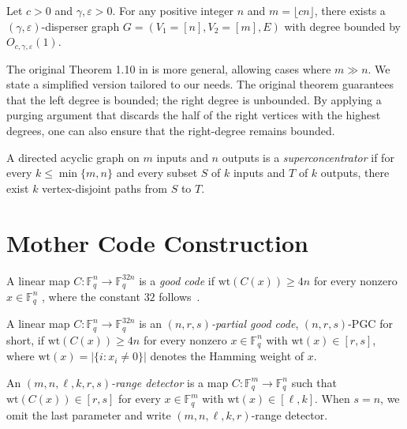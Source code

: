 \documentclass[11pt]{article}
\theoremstyle{named}
\begin{document}
\begin{theorem} \label{thm:prob_disperser} Let $c > 0$ and $\gamma, \varepsilon > 0$. For any positive integer $n$ and $m = \lfloor cn \rfloor$, there exists a $(\gamma, \varepsilon)$-disperser graph $G = (V_1 = [n], V_2 = [m], E)$ with degree bounded by $O_{c, \gamma, \varepsilon}(1)$.
\end{theorem}

The original Theorem 1.10 in \cite{RT00} is more general, allowing cases where $m \gg n$. We state a simplified version tailored to our needs. The original theorem guarantees that the left degree is bounded; the right degree is unbounded.
By applying a purging argument that discards the half of the right vertices with the highest degrees, one can also ensure that the right-degree remains bounded.

\begin{definition} \cite{Val75}
A directed acyclic graph on $m$ inputs and $n$ outputs is a \emph{superconcentrator} if for every $k \le \min\{m, n\}$ and every subset $S$ of $k$ inputs and $T$ of $k$ outputs, there exist $k$ vertex-disjoint paths from $S$ to $T$.
\end{definition}



\section{Mother Code Construction}

A linear map $C: \mathbb{F}_q^n \to \mathbb{F}_q^{32n}$ is a \emph{good code} if $\mathrm{wt}(C(x)) \ge 4n$ for every nonzero $x \in \mathbb{F}_q^n$ \cite{drucker2023minimum}, where the constant $32$ follows~\cite{GHK+12}.

A linear map $C : \mathbb{F}_q^{n} \to \mathbb{F}_q^{32n}$ is an \emph{$(n, r, s)$-partial good code}, $(n,r,s)$-PGC for short, if $\mathrm{wt}(C(x)) \ge 4n$ for every nonzero $x \in \mathbb{F}_q^{n}$ with $\mathrm{wt}(x) \in [r, s]$, where $\mathrm{wt}(x) = |\{i : x_i \neq 0\}|$ denotes the Hamming weight of $x$.


\begin{definition} \label{def:range_detector}
\cite{GHK+12} An \emph{$(m, n, \ell, k, r, s)$-range detector} is a map $C:\mathbb{F}_q^m \to \mathbb{F}_q^n$ such that $\mathrm{wt}(C(x)) \in [r, s]$ for every $x \in \mathbb{F}_q^m$ with $\mathrm{wt}(x) \in [\ell, k]$. When $s = n$, we omit the last parameter and write $(m, n, \ell, k, r)$-range detector.
\end{definition}
\end{document}
